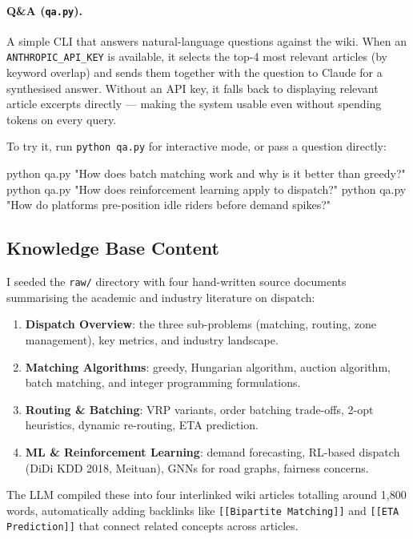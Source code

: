 \documentclass[11pt,a4paper]{article}
\begin{document}
\paragraph{Q\&A (\texttt{qa.py}).}
A simple CLI that answers natural-language questions against the wiki.
When an \texttt{ANTHROPIC\_API\_KEY} is available, it selects the top-4 most relevant
articles (by keyword overlap) and sends them together with the question to Claude for a
synthesised answer.
Without an API key, it falls back to displaying relevant article excerpts directly ---
making the system usable even without spending tokens on every query.

To try it, run \texttt{python qa.py} for interactive mode, or pass a question directly:

\begin{codeblock}
python qa.py "How does batch matching work and why is it better than greedy?"
python qa.py "How does reinforcement learning apply to dispatch?"
python qa.py "How do platforms pre-position idle riders before demand spikes?"
\end{codeblock}

\subsection{Knowledge Base Content}

I seeded the \texttt{raw/} directory with four hand-written source documents
summarising the academic and industry literature on dispatch:

\begin{enumerate}[leftmargin=*, itemsep=1pt]
    \item \textbf{Dispatch Overview}: the three sub-problems (matching, routing, zone management),
          key metrics, and industry landscape.
    \item \textbf{Matching Algorithms}: greedy, Hungarian algorithm, auction algorithm,
          batch matching, and integer programming formulations.
    \item \textbf{Routing \& Batching}: VRP variants, order batching trade-offs,
          2-opt heuristics, dynamic re-routing, ETA prediction.
    \item \textbf{ML \& Reinforcement Learning}: demand forecasting, RL-based dispatch
          (DiDi KDD 2018, Meituan), GNNs for road graphs, fairness concerns.
\end{enumerate}

The LLM compiled these into four interlinked wiki articles totalling around 1,800 words,
automatically adding backlinks like \texttt{[[Bipartite Matching]]} and
\texttt{[[ETA Prediction]]} that connect related concepts across articles.
\end{document}

